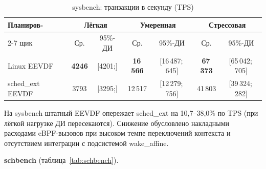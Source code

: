 \documentclass[12pt, oneside]{book}
\newenvironment{customquote}
{\list{}{\leftmargin=0.5cm
                \rightmargin=0.5cm
                \topsep=0pt
                \partopsep=0pt
                \parsep=2pt
                \itemsep=0pt
        }%
        \normalfont\relax
\item\relax}
{\endlist}
\begin{document}
\begin{customquote}
        \begin{table}[!ht]
                \centering
                \caption{sysbench: транзакции в секунду (TPS)}
                \label{tab:sysbench}
                \vspace{0.3em}
                \begin{tabular}{|l|c|c|c|c|c|c|}
                        \hline
                        Планиров- & \multicolumn{2}{c|}{Лёгкая}
                                  & \multicolumn{2}{c|}{Умеренная}
                                  & \multicolumn{2}{c|}{Стрессовая} \\
                        \cline{2-7}
                        щик & Ср. & 95\%-ДИ & Ср. & 95\%-ДИ & Ср. & 95\%-ДИ \\
                        \hline
                        Linux EEVDF & \textbf{4246} & {\scriptsize [4201;\:4292]}
                                   & \textbf{16\,566} & {\scriptsize [16\,487;\:16\,645]}
                                   & \textbf{67\,373} & {\scriptsize [65\,042;\:69\,705]} \\
                        sched\_ext EEVDF & 3793 & {\scriptsize [3295;\:4292]}
                                   & 12\,517 & {\scriptsize [12\,279;\:12\,756]}
                                   & 41\,803 & {\scriptsize [39\,324;\:44\,282]} \\
                        \hline
                \end{tabular}
        \end{table}

        \quad На sysbench штатный EEVDF опережает
        sched\_ext на 10,7--38,0\% по TPS (при лёгкой
        нагрузке ДИ пересекаются). Снижение обусловлено
        накладными расходами eBPF-вызовов при высоком
        темпе переключений контекста и отсутствием
        интеграции с подсистемой wake\_affine.

        \quad \textbf{schbench}
        (таблица~\ref{tab:schbench}).


\end{customquote}
\end{document}
